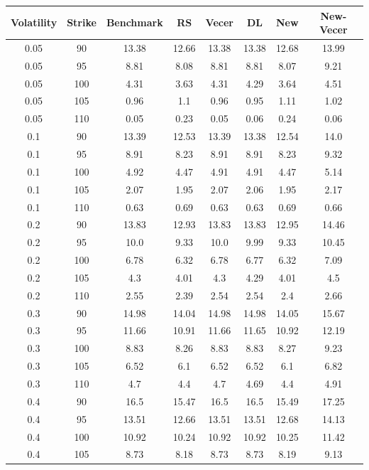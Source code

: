 \documentclass[12pt]{report}
\begin{document}
\scriptsize
\begin{table}[H]
  \begin{tabular}{|c|c|c|c|c|c|c|c|}
  \hline
  Volatility & Strike & Benchmark & RS & Vecer & DL & New & New-Vecer \\
  \hline
  0.05 & 90 & 13.38 & 12.66 & 13.38 & 13.38 & 12.68 & 13.99 \\
  0.05 & 95 & 8.81 & 8.08 & 8.81 & 8.81 & 8.07 & 9.21 \\
  0.05 & 100 & 4.31 & 3.63 & 4.31 & 4.29 & 3.64 & 4.51 \\
  0.05 & 105 & 0.96 & 1.1 & 0.96 & 0.95 & 1.11 & 1.02 \\
  0.05 & 110 & 0.05 & 0.23 & 0.05 & 0.06 & 0.24 & 0.06 \\
  0.1 & 90 & 13.39 & 12.53 & 13.39 & 13.38 & 12.54 & 14.0 \\
  0.1 & 95 & 8.91 & 8.23 & 8.91 & 8.91 & 8.23 & 9.32 \\
  0.1 & 100 & 4.92 & 4.47 & 4.91 & 4.91 & 4.47 & 5.14 \\
  0.1 & 105 & 2.07 & 1.95 & 2.07 & 2.06 & 1.95 & 2.17 \\
  0.1 & 110 & 0.63 & 0.69 & 0.63 & 0.63 & 0.69 & 0.66 \\
  0.2 & 90 & 13.83 & 12.93 & 13.83 & 13.83 & 12.95 & 14.46 \\
  0.2 & 95 & 10.0 & 9.33 & 10.0 & 9.99 & 9.33 & 10.45 \\
  0.2 & 100 & 6.78 & 6.32 & 6.78 & 6.77 & 6.32 & 7.09 \\
  0.2 & 105 & 4.3 & 4.01 & 4.3 & 4.29 & 4.01 & 4.5 \\
  0.2 & 110 & 2.55 & 2.39 & 2.54 & 2.54 & 2.4 & 2.66 \\
  0.3 & 90 & 14.98 & 14.04 & 14.98 & 14.98 & 14.05 & 15.67 \\
  0.3 & 95 & 11.66 & 10.91 & 11.66 & 11.65 & 10.92 & 12.19 \\
  0.3 & 100 & 8.83 & 8.26 & 8.83 & 8.83 & 8.27 & 9.23 \\
  0.3 & 105 & 6.52 & 6.1 & 6.52 & 6.52 & 6.1 & 6.82 \\
  0.3 & 110 & 4.7 & 4.4 & 4.7 & 4.69 & 4.4 & 4.91 \\
  0.4 & 90 & 16.5 & 15.47 & 16.5 & 16.5 & 15.49 & 17.25 \\
  0.4 & 95 & 13.51 & 12.66 & 13.51 & 13.51 & 12.68 & 14.13 \\
  0.4 & 100 & 10.92 & 10.24 & 10.92 & 10.92 & 10.25 & 11.42 \\
  0.4 & 105 & 8.73 & 8.18 & 8.73 & 8.73 & 8.19 & 9.13 \\

\end{tabular}
\end{table}
\end{document}
